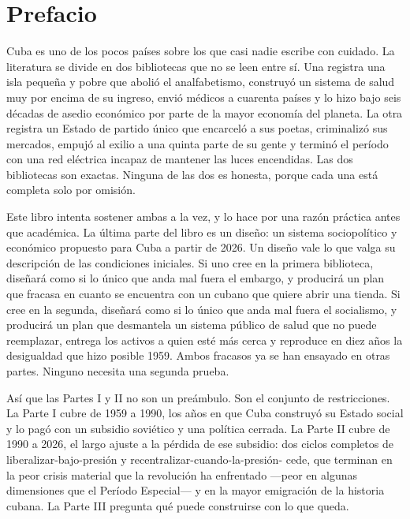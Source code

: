 \chapter*{Prefacio}

Cuba es uno de los pocos países sobre los que casi nadie escribe con cuidado.
La literatura se divide en dos bibliotecas que no se leen entre sí. Una registra
una isla pequeña y pobre que abolió el analfabetismo, construyó un sistema de
salud muy por encima de su ingreso, envió médicos a cuarenta países y lo hizo
bajo seis décadas de asedio económico por parte de la mayor economía del
planeta. La otra registra un Estado de partido único que encarceló a sus poetas,
criminalizó sus mercados, empujó al exilio a una quinta parte de su gente y
terminó el período con una red eléctrica incapaz de mantener las luces
encendidas. Las dos bibliotecas son exactas. Ninguna de las dos es honesta,
porque cada una está completa solo por omisión.

Este libro intenta sostener ambas a la vez, y lo hace por una razón práctica
antes que académica. La última parte del libro es un diseño: un sistema
sociopolítico y económico propuesto para Cuba a partir de 2026. Un diseño vale
lo que valga su descripción de las condiciones iniciales. Si uno cree en la
primera biblioteca, diseñará como si lo único que anda mal fuera el embargo, y
producirá un plan que fracasa en cuanto se encuentra con un cubano que quiere
abrir una tienda. Si cree en la segunda, diseñará como si lo único que anda mal
fuera el socialismo, y producirá un plan que desmantela un sistema público de
salud que no puede reemplazar, entrega los activos a quien esté más cerca y
reproduce en diez años la desigualdad que hizo posible 1959. Ambos fracasos ya
se han ensayado en otras partes. Ninguno necesita una segunda prueba.

Así que las Partes I y II no son un preámbulo. Son el conjunto de
restricciones. La Parte I cubre de 1959 a 1990, los años en que Cuba construyó
su Estado social y lo pagó con un subsidio soviético y una política cerrada. La
Parte II cubre de 1990 a 2026, el largo ajuste a la pérdida de ese subsidio: dos
ciclos completos de liberalizar-bajo-presión y recentralizar-cuando-la-presión-
cede, que terminan en la peor crisis material que la revolución ha enfrentado
---peor en algunas dimensiones que el Período Especial--- y en la mayor
emigración de la historia cubana. La Parte III pregunta qué puede construirse
con lo que queda.

